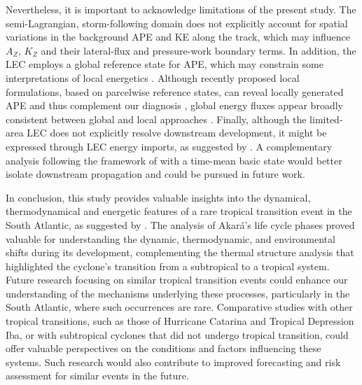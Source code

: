 \documentclass[pdflatex,sn-chicago]{sn-jnl}%
\theoremstyle{plain}
\theoremstyle{definition}
\theoremstyle{remark}
\theoremstyle{definition}
\begin{document}
Nevertheless, it is important to acknowledge limitations of the present study. The semi-Lagrangian, storm-following domain does not explicitly account for spatial variations in the background APE and KE along the track, which may influence \(A_Z\), \(K_Z\) and their lateral-flux and pressure-work boundary terms. In addition, the LEC employs a global reference state for APE, which may constrain some interpretations of local energetics \citep[e.g.,][]{smith1980energetics}. Although recently proposed local formulations, based on parcelwise reference states, can reveal locally generated APE and thus complement our diagnosis \citep{novak2018local,federer2024local}, global energy fluxes appear broadly consistent between global and local approaches \citep[e.g.,][]{liu2024systematic}. Finally, although the limited-area LEC does not explicitly resolve downstream development, it might be expressed through LEC energy imports, as suggested by \citet{michaelides1999quasi}. A complementary analysis following the framework of \citet{orlanski1991life} with a time-mean basic state would better isolate downstream propagation and could be pursued in future work.

In conclusion, this study provides valuable insights into the dynamical, thermodynamical and energetic features of a rare tropical transition event in the South Atlantic, as suggested by \citet{reboita2024assessment}. The analysis of Akará's life cycle phases proved valuable for understanding the dynamic, thermodynamic, and environmental shifts during its development, complementing the thermal structure analysis that highlighted the cyclone's transition from a subtropical to a tropical system. Future research focusing on similar tropical transition events could enhance our understanding of the mechanisms underlying these processes, particularly in the South Atlantic, where such occurrences are rare. Comparative studies with other tropical transitions, such as those of Hurricane Catarina and Tropical Depression Iba, or with subtropical cyclones that did not undergo tropical transition, could offer valuable perspectives on the conditions and factors influencing these systems. Such research would also contribute to improved forecasting and risk assessment for similar events in the future.


\backmatter



\end{document}
